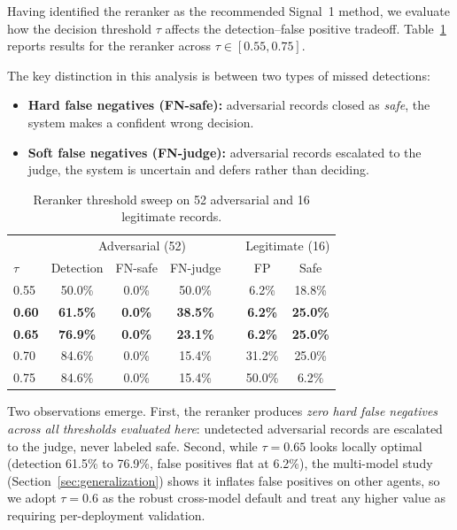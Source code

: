 \documentclass[11pt,a4paper]{article}
\begin{document}
Having identified the reranker as the recommended Signal~1 method, we evaluate
how the decision threshold $\tau$ affects the detection--false positive tradeoff. Table~\ref{tab:threshold}
reports results for the reranker across $\tau \in [0.55, 0.75]$.

The key distinction in this analysis is between two types of missed detections:
\begin{itemize}
  \item \textbf{Hard false negatives (FN-safe):} adversarial records closed as \textit{safe}, the
    system makes a confident wrong decision.
  \item \textbf{Soft false negatives (FN-judge):} adversarial records escalated to the
    judge, the system is uncertain and defers rather than deciding.
\end{itemize}

\begin{table}[h]
  \centering
  \caption{Reranker threshold sweep on 52 adversarial and 16 legitimate records.}
  \label{tab:threshold}
  \begin{tabular}{lcccc|cc}
    \toprule
    & \multicolumn{4}{c|}{Adversarial (52)} & \multicolumn{2}{c}{Legitimate (16)} \\
    $\tau$ & Detection & FN-safe & FN-judge & & FP & Safe \\
    \midrule
    0.55 & 50.0\% & 0.0\% & 50.0\% & & 6.2\%  & 18.8\% \\
    \textbf{0.60} & \textbf{61.5\%} & \textbf{0.0\%} & \textbf{38.5\%} & & \textbf{6.2\%}  & \textbf{25.0\%} \\
    \textbf{0.65} & \textbf{76.9\%} & \textbf{0.0\%} & \textbf{23.1\%} & & \textbf{6.2\%}  & \textbf{25.0\%} \\
    0.70 & 84.6\% & 0.0\% & 15.4\% & & 31.2\% & 25.0\% \\
    0.75 & 84.6\% & 0.0\% & 15.4\% & & 50.0\% & 6.2\%  \\
    \bottomrule
  \end{tabular}
\end{table}

Two observations emerge. First, the reranker produces \emph{zero hard false negatives across all
thresholds evaluated here}: undetected adversarial records are escalated to the judge, never
labeled safe. Second, while $\tau = 0.65$ looks locally optimal (detection 61.5\% to 76.9\%, false
positives flat at 6.2\%), the multi-model study (Section~\ref{sec:generalization}) shows it
inflates false positives on other agents, so we adopt $\tau = 0.6$ as the robust cross-model
default and treat any higher value as requiring per-deployment validation.
\end{document}
